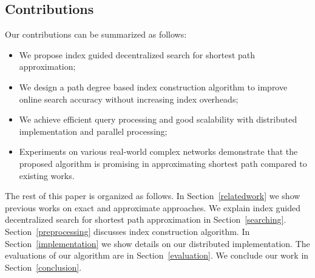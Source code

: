 \subsection{Contributions}
Our contributions can be summarized as follows:

\begin{itemize}
	\item We propose index guided decentralized search for shortest path approximation;
	\item We design a path degree based index construction algorithm to improve online search accuracy without increasing index overheads;
	\item We achieve efficient query processing and good scalability with distributed implementation and parallel processing;
	\item Experiments on various real-world complex networks demonstrate that the proposed algorithm is promising in approximating shortest path compared to existing works.
\end{itemize}

The rest of this paper is organized as follows. In Section~\ref{relatedwork} we show previous works on exact and approximate approaches. We explain index guided decentralized search for shortest path approximation in Section~\ref{searching}. Section~\ref{preprocessing} discusses index construction algorithm. In Section~\ref{implementation} we show details on our distributed implementation. The evaluations of our algorithm are in Section~\ref{evaluation}. We conclude our work in Section~\ref{conclusion}.
